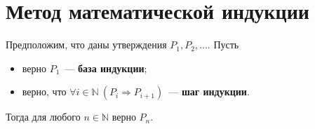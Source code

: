 \section{Метод математической индукции}
 Предположим, что даны утверждения $P_1, P_2, \ldots$.
Пусть
\begin{itemize}
	\item верно $P_1$~--- \textbf{база индукции};
	\item верно, что $\forall i \in \mathbb N \ (P_i \Rightarrow P_{i+1})$~--- \textbf{шаг индукции}.
\end{itemize}

Тогда для любого $n \in \mathbb N$ верно $P_n$.
